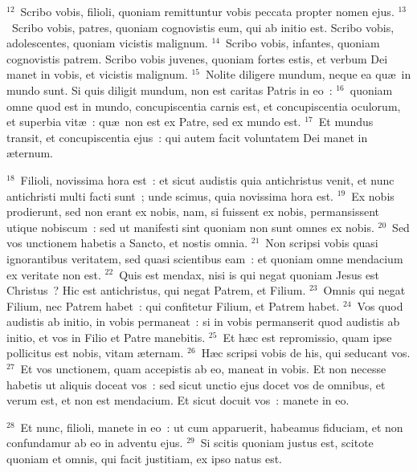 ${}^{12}$~Scribo vobis, filioli, quoniam remittuntur vobis peccata propter nomen ejus.
${}^{13}$~Scribo vobis, patres, quoniam cognovistis eum, qui ab initio est. Scribo vobis, adolescentes, quoniam vicistis malignum.
${}^{14}$~Scribo vobis, infantes, quoniam cognovistis patrem. Scribo vobis juvenes, quoniam fortes estis, et verbum Dei manet in vobis, et vicistis malignum.
${}^{15}$~Nolite diligere mundum, neque ea qu\ae\ in mundo sunt. Si quis diligit mundum, non est caritas Patris in eo~:
${}^{16}$~quoniam omne quod est in mundo, concupiscentia carnis est, et concupiscentia oculorum, et superbia vit\ae~: qu\ae\ non est ex Patre, sed ex mundo est.
${}^{17}$~Et mundus transit, et concupiscentia ejus~: qui autem facit voluntatem Dei manet in \ae ternum.


${}^{18}$~Filioli, novissima hora est~: et sicut audistis quia antichristus venit, et nunc antichristi multi facti sunt~; unde scimus, quia novissima hora est.
${}^{19}$~Ex nobis prodierunt, sed non erant ex nobis, nam, si fuissent ex nobis, permansissent utique nobiscum~: sed ut manifesti sint quoniam non sunt omnes ex nobis.
${}^{20}$~Sed vos unctionem habetis a Sancto, et nostis omnia.
${}^{21}$~Non scripsi vobis quasi ignorantibus veritatem, sed quasi scientibus eam~: et quoniam omne mendacium ex veritate non est.
${}^{22}$~Quis est mendax, nisi is qui negat quoniam Jesus est Christus~? Hic est antichristus, qui negat Patrem, et Filium.
${}^{23}$~Omnis qui negat Filium, nec Patrem habet~: qui confitetur Filium, et Patrem habet.
${}^{24}$~Vos quod audistis ab initio, in vobis permaneat~: si in vobis permanserit quod audistis ab initio, et vos in Filio et Patre manebitis.
${}^{25}$~Et h\ae c est repromissio, quam ipse pollicitus est nobis, vitam \ae ternam.
${}^{26}$~H\ae c scripsi vobis de his, qui seducant vos.
${}^{27}$~Et vos unctionem, quam accepistis ab eo, maneat in vobis. Et non necesse habetis ut aliquis doceat vos~: sed sicut unctio ejus docet vos de omnibus, et verum est, et non est mendacium. Et sicut docuit vos~: manete in eo.


${}^{28}$~Et nunc, filioli, manete in eo~: ut cum apparuerit, habeamus fiduciam, et non confundamur ab eo in adventu ejus.
${}^{29}$~Si scitis quoniam justus est, scitote quoniam et omnis, qui facit justitiam, ex ipso natus est.

